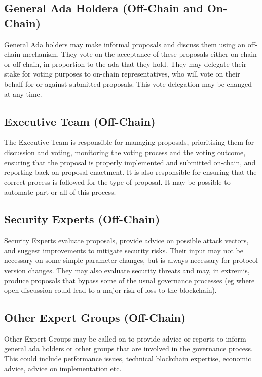 \subsection{General Ada Holdera (Off-Chain and On-Chain)}

General Ada holders may make informal proposals and discuss them using an off-chain mechanism.  They vote on the acceptance of these proposals
either on-chain or off-chain, in proportion to the ada that they hold.  They may delegate their stake for voting purposes to on-chain representatives,
who will vote on their behalf for or against submitted proposals.  This vote delegation may be changed at any time.

\subsection{Executive Team (Off-Chain)}

The Executive Team is responsible for managing proposals, prioritising them for discussion and voting, monitoring the voting process and the
voting outcome, ensuring that the proposal is properly implemented and submitted on-chain, and reporting back on proposal enactment.
It is also responsible for ensuring that the correct process is followed for the type of proposal.  It may be possible to automate part or all of this process.

\subsection{Security Experts (Off-Chain)}

Security Experts evaluate proposals, provide advice on possible attack vectors, and suggest improvements to mitigate security risks.
Their input may not be necessary on some simple parameter changes, but is always necessary for protocol version changes.
They may also evaluate security threats and may, in extremis, produce proposals that bypass some of the usual governance processes
(eg where open discussion could lead to a major risk of loss to the blockchain).

\subsection{Other Expert Groups (Off-Chain)}

Other Expert Groups may be called on to provide advice or reports to inform general ada holders or other groups that are involved in the
governance process.  This could include performance issues, technical blockchain expertise, economic advice, advice on implementation etc.

